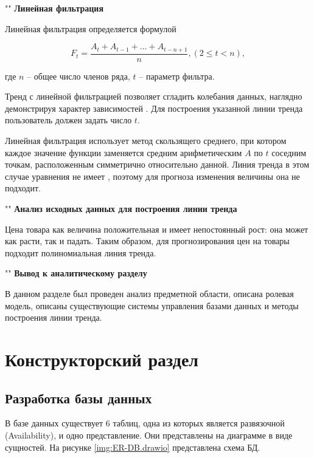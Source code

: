 \documentclass[a4paper]{bmstu}
\begin{document}
""\newline
\noindent\textbf{Линейная фильтрация}

Линейная фильтрация определяется формулой

\begin{equation}
	F_t = \frac{A_t + A_{t-1} + ... + A_{t-n+1}}{n}, (2 \leqslant t < n),
\end{equation}

где $n$ -- общее число членов ряда, $t$ -- параметр фильтра.

Тренд с линейной фильтрацией позволяет сгладить колебания данных, наглядно демонстрируя характер зависимостей \cite{lt-exel}. Для построения указанной линии тренда пользователь должен задать число $t$.

Линейная фильтрация использует метод скользящего среднего, при котором каждое значение функции заменяется средним арифметическим $A$ по $t$ соседним точкам, расположенным симметрично относительно данной. Линия тренда в этом случае уравнения не имеет \cite{lin-filt}, поэтому для прогноза изменения величины она не подходит.

""\newline
\noindent\textbf{Анализ исходных данных для построения линии тренда}

Цена товара как величина положительная и имеет непостоянный рост: она может как расти, так и падать. Таким образом, для прогнозирования цен на товары подходит полиномиальная линия тренда.

""\newline
\noindent\textbf{Вывод к аналитическому разделу}

В данном разделе был проведен анализ предметной области, описана ролевая модель, описаны существующие системы управления базами данных и методы построения линии тренда.

\chapter{Конструкторский раздел}

\section{Разработка базы данных}

В базе данных существует 6 таблиц, одна из которых является развязочной (Availability), и одно представление. Они представлены на диаграмме в виде сущностей. На рисунке \ref{img:ER-DB.drawio} представлена схема БД.
\end{document}
